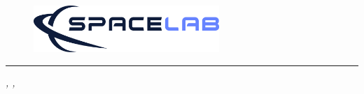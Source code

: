 %
%
%
%
%
%
%
%
%
%

\begin{titlepage}

\thispagestyle{empty}

\begin{flushleft}
    \large
    \printdocID
\end{flushleft}

\vspace{1cm}

\begin{figure}[!ht]
    \begin{flushleft}
        \includegraphics[width=7cm]{figures/spacelab-logo.png}
    \end{flushleft}
\end{figure}

\begin{flushleft}
    \Huge{\textbf{\printtitle}}
    \rule[0pt]{\textwidth}{5pt}
\end{flushleft}

\vspace{0.2cm}

\begin{flushleft}
    \textit{\printlab, \printinstitution, \printlocal}
\end{flushleft}

\vspace{2cm}


\end{titlepage}
